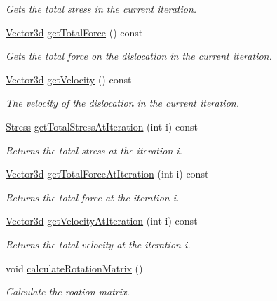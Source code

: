 \begin{DoxyCompactItemize}
\begin{DoxyCompactList}\small\item\em \-Gets the total stress in the current iteration. \end{DoxyCompactList}\item 
\hyperlink{classVector3d}{\-Vector3d} \hyperlink{classDislocation_a826a6aae1035b454cfc42db4bb863a4d}{get\-Total\-Force} () const 
\begin{DoxyCompactList}\small\item\em \-Gets the total force on the dislocation in the current iteration. \end{DoxyCompactList}\item 
\hyperlink{classVector3d}{\-Vector3d} \hyperlink{classDislocation_a74b8029dd76a9a43ac437aa144132a72}{get\-Velocity} () const 
\begin{DoxyCompactList}\small\item\em \-The velocity of the dislocation in the current iteration. \end{DoxyCompactList}\item 
\hyperlink{classStress}{\-Stress} \hyperlink{classDislocation_af57a21490312108d68540544596cc7a7}{get\-Total\-Stress\-At\-Iteration} (int i) const 
\begin{DoxyCompactList}\small\item\em \-Returns the total stress at the iteration i. \end{DoxyCompactList}\item 
\hyperlink{classVector3d}{\-Vector3d} \hyperlink{classDislocation_a2a693d6e986cf0d8bed2a55e6ce721bd}{get\-Total\-Force\-At\-Iteration} (int i) const 
\begin{DoxyCompactList}\small\item\em \-Returns the total force at the iteration i. \end{DoxyCompactList}\item 
\hyperlink{classVector3d}{\-Vector3d} \hyperlink{classDislocation_a6cf00cadeb4b42c4b3126d15137d1f04}{get\-Velocity\-At\-Iteration} (int i) const 
\begin{DoxyCompactList}\small\item\em \-Returns the total velocity at the iteration i. \end{DoxyCompactList}\item 
void \hyperlink{classDislocation_aa249f1f46486fd183757ed5049586e73}{calculate\-Rotation\-Matrix} ()
\begin{DoxyCompactList}\small\item\em \-Calculate the roation matrix. \end{DoxyCompactList}\item 

\end{DoxyCompactItemize}
